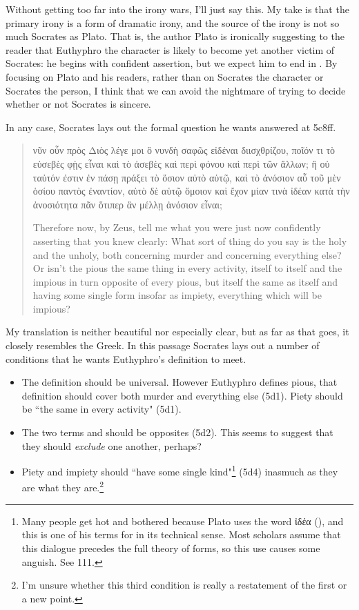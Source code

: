 \documentclass[11pt]{article}
\begin{document}
Without getting too far into the irony wars, I'll just say this. My take is
that the primary irony is a form of dramatic irony, and the source of the
irony is not so much Socrates as Plato. That is, the author Plato is
ironically suggesting to the reader that Euthyphro the character is likely
to become yet another victim of Socrates: he begins with confident
assertion, but we expect him to end in .  By focusing on
Plato and his readers, rather than on Socrates the character or Socrates
the person, I think that we can avoid the nightmare of trying to decide
whether or not Socrates is sincere.

In any case, Socrates lays out the formal question he wants answered at
5c8ff.

\begin{quote}
    νῦν οὖν πρὸς Διὸς λέγε μοι ὃ νυνδὴ σαφῶς εἰδέναι διισχθρίζου, ποῖόν τι
    τὸ εὐσεβὲς φῂς εἶναι καὶ τὸ ἀσεβὲς καὶ περὶ φόνου καὶ περὶ τῶν ἄλλων;
    ἢ οὐ ταὐτόν ἐστιν ἐν πάσῃ πράξει τὸ ὅσιον αὐτὸ αὑτῷ, καὶ τὸ ἀνόσιον αὖ
    τοῦ μὲν ὁσίου παντὸς ἐναντίον, αὐτὸ δὲ αὑτῷ ὅμοιον καὶ ἔχον μίαν τινὰ
    ἰδέαν κατὰ τὴν ἀνοσιότητα πᾶν ὅτιπερ ἂν μέλλῃ ἀνόσιον εἶναι;

    Therefore now, by Zeus, tell me what you were just now confidently
    asserting that you knew clearly: What sort of thing do you say is the
    holy and the unholy, both concerning murder and concerning everything
    else? Or isn't the pious the same thing in every activity, itself to
    itself and the impious in turn opposite of every pious, but itself the
    same as itself and having some single form insofar as impiety,
    everything which will be impious?
\end{quote}

My translation is neither beautiful nor especially clear, but as far as
that goes, it closely resembles the Greek. In this passage Socrates lays
out a number of conditions that he wants Euthyphro's definition to meet.

\begin{itemize}
    \item The definition should be universal. However Euthyphro defines
        pious, that definition should cover both murder and everything else
        (5d1). Piety should be ``the same in every activity" (5d1).
    \item The two terms  and  should be
        opposites (5d2). This seems to suggest that they should
        \emph{exclude} one another, perhaps?
    \item Piety and impiety should ``have some single kind"\footnote{Many
        people get hot and bothered because Plato uses the word ἰδέα
        (), and this is one of his terms for 
        in its technical sense.  Most scholars assume that this dialogue
        precedes the full theory of forms, so this use causes some anguish.
        See \citet{burnet1924} 111.} (5d4) inasmuch as they are what they
        are.\footnote{I'm unsure whether this third condition is really a
        restatement of the first or a new point.}
\end{itemize}
\end{document}
